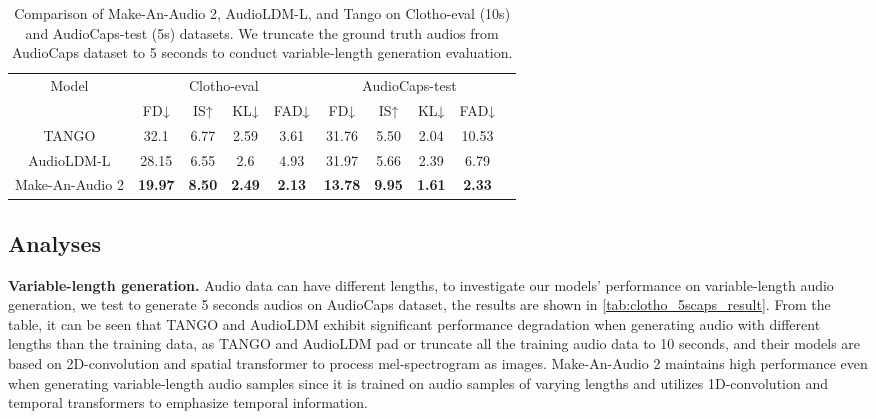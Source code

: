 \documentclass{article}
\begin{document}
\begin{table*}[!h]
  \centering
  \small
  \caption{Comparison of Make-An-Audio 2, AudioLDM-L, and Tango on Clotho-eval (10s) and AudioCaps-test (5s) datasets. We truncate the ground truth audios from AudioCaps dataset to 5 seconds to conduct variable-length generation evaluation.}
  \vspace{2mm}
  \begin{tabular}{c|cccc|ccccc}
    \toprule
    \multirow{2}{*}{Model} & \multicolumn{4}{c|}{Clotho-eval} & \multicolumn{4}{c}{AudioCaps-test} \\
& FD↓ & IS↑ & KL↓ & FAD↓ & FD↓ & IS↑ & KL↓ & FAD↓ \\
    \midrule
    TANGO & 32.1 & 6.77 & 2.59 & 3.61 & 31.76 & 5.50 & 2.04 & 10.53 \\
    AudioLDM-L & 28.15 & 6.55 & 2.6 & 4.93 & 31.97 & 5.66 & 2.39 & 6.79 \\
    Make-An-Audio 2 & \textbf{19.97} & \textbf{8.50} & \textbf{2.49} & \textbf{2.13} & \textbf{13.78} & \textbf{9.95} & \textbf{1.61} & \textbf{2.33} \\
    \bottomrule
  \end{tabular}
  \label{tab:clotho_5scaps_result}
\end{table*}


\subsection{Analyses}


\textbf{Variable-length generation.} Audio data can have different lengths, to investigate our models' performance on variable-length audio generation, we test to generate 5 seconds audios on AudioCaps dataset, the results are shown in \autoref{tab:clotho_5scaps_result}. From the table, it can be seen that TANGO and AudioLDM exhibit significant performance degradation when generating audio with different lengths than the training data, as TANGO and AudioLDM pad or truncate all the training audio data to 10 seconds, and their models are based on 2D-convolution and spatial transformer to process mel-spectrogram as images. Make-An-Audio 2 maintains high performance even when generating variable-length audio samples since it is trained on audio samples of varying lengths and utilizes 1D-convolution and temporal transformers to emphasize temporal information.
\end{document}
